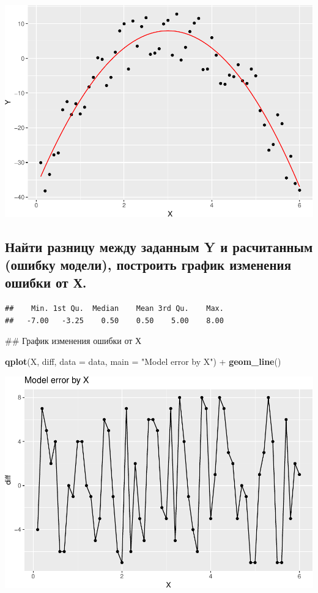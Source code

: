 \documentclass[]{article}
\newenvironment{Shaded}{\begin{snugshade}}{\end{snugshade}}
\newcommand{\KeywordTok}[1]{\textcolor[rgb]{0.13,0.29,0.53}{\textbf{{#1}}}}
\newcommand{\DataTypeTok}[1]{\textcolor[rgb]{0.13,0.29,0.53}{{#1}}}
\newcommand{\StringTok}[1]{\textcolor[rgb]{0.31,0.60,0.02}{{#1}}}
\newcommand{\NormalTok}[1]{{#1}}
\begin{document}
\includegraphics{DZ3_files/figure-latex/unnamed-chunk-6-1.pdf}

\subsection{Найти разницу между заданным Y и расчитанным (ошибку
модели), построить график изменения ошибки от
Х.}\label{----y----------.}

\begin{Shaded}
\end{Shaded}

\begin{verbatim}
##    Min. 1st Qu.  Median    Mean 3rd Qu.    Max. 
##   -7.00   -3.25    0.50    0.50    5.00    8.00
\end{verbatim}

\begin{Shaded}
\begin{Highlighting}[]
\NormalTok{## График изменения ошибки от Х}

\KeywordTok{qplot}\NormalTok{(X, diff, }\DataTypeTok{data =} \NormalTok{data, }\DataTypeTok{main =} \StringTok{"Model error by X"}\NormalTok{) +}\StringTok{ }\KeywordTok{geom_line}\NormalTok{()}
\end{Highlighting}
\end{Shaded}

\includegraphics{DZ3_files/figure-latex/unnamed-chunk-8-1.pdf}
\end{document}
